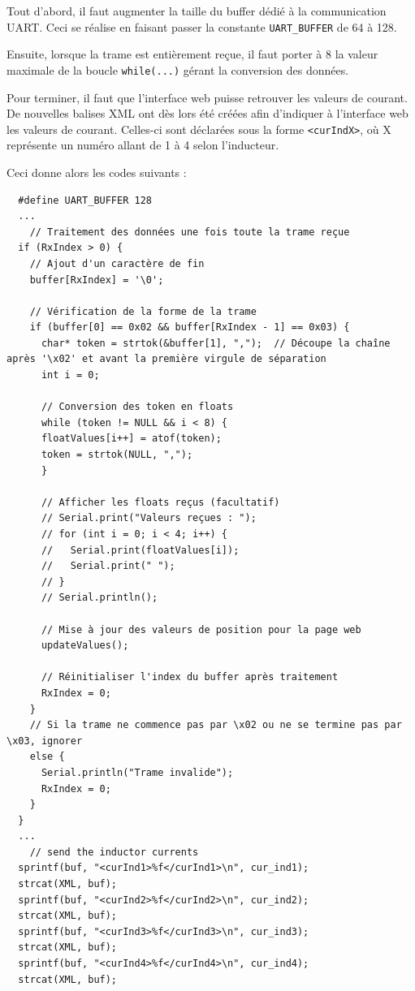 Tout d'abord, il faut augmenter la taille du buffer dédié à la communication UART. Ceci se réalise en faisant passer la constante \texttt{UART\_BUFFER} de 64 à 128.

Ensuite, lorsque la trame est entièrement reçue, il faut porter à 8 la valeur maximale de la boucle \texttt{while(...)} gérant la conversion des données.

Pour terminer, il faut que l'interface web puisse retrouver les valeurs de courant. De nouvelles balises XML ont dès lors été créées afin d'indiquer à l'interface web les valeurs de courant. Celles-ci sont déclarées sous la forme \texttt{<curIndX>}, où X représente un numéro allant de 1 à 4 selon l'inducteur.

Ceci donne alors les codes suivants :

\begin{verbatim}
  #define UART_BUFFER 128
  ...
    // Traitement des données une fois toute la trame reçue
  if (RxIndex > 0) {
    // Ajout d'un caractère de fin
    buffer[RxIndex] = '\0';

    // Vérification de la forme de la trame
    if (buffer[0] == 0x02 && buffer[RxIndex - 1] == 0x03) {
      char* token = strtok(&buffer[1], ",");  // Découpe la chaîne après '\x02' et avant la première virgule de séparation
      int i = 0;

      // Conversion des token en floats
      while (token != NULL && i < 8) {
      floatValues[i++] = atof(token);
      token = strtok(NULL, ",");
      }

      // Afficher les floats reçus (facultatif)
      // Serial.print("Valeurs reçues : ");
      // for (int i = 0; i < 4; i++) {
      //   Serial.print(floatValues[i]);
      //   Serial.print(" ");
      // }
      // Serial.println();

      // Mise à jour des valeurs de position pour la page web
      updateValues();

      // Réinitialiser l'index du buffer après traitement
      RxIndex = 0;
    }
    // Si la trame ne commence pas par \x02 ou ne se termine pas par \x03, ignorer
    else {
      Serial.println("Trame invalide");
      RxIndex = 0;
    }
  }
  ...
    // send the inductor currents
  sprintf(buf, "<curInd1>%f</curInd1>\n", cur_ind1);
  strcat(XML, buf);
  sprintf(buf, "<curInd2>%f</curInd2>\n", cur_ind2);
  strcat(XML, buf);
  sprintf(buf, "<curInd3>%f</curInd3>\n", cur_ind3);
  strcat(XML, buf);
  sprintf(buf, "<curInd4>%f</curInd4>\n", cur_ind4);
  strcat(XML, buf);
\end{verbatim}


